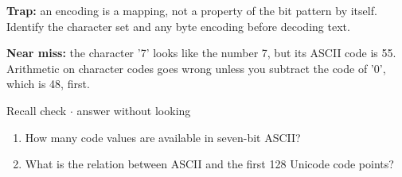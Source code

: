 \documentclass[11pt]{article}
\begin{document}
\begin{keepsection}
\begin{keepsection}
\begin{notebox}\textbf{Trap:} an encoding is a mapping, not a property of the bit pattern by itself. Identify the character set and any byte encoding before decoding text.\end{notebox}

\begin{notebox}\textbf{Near miss:} the character '7' looks like the number 7, but its ASCII code is 55. Arithmetic on character codes goes wrong unless you subtract the code of '0', which is 48, first.\end{notebox}

\begin{recallbox}{Recall check \ensuremath{\cdot} answer without looking}
\begin{enumerate}
\item How many code values are available in seven-bit ASCII?
\item What is the relation between ASCII and the first 128 Unicode code points?
\end{enumerate}

\end{recallbox}
\end{keepsection}
\end{keepsection}
\end{document}
